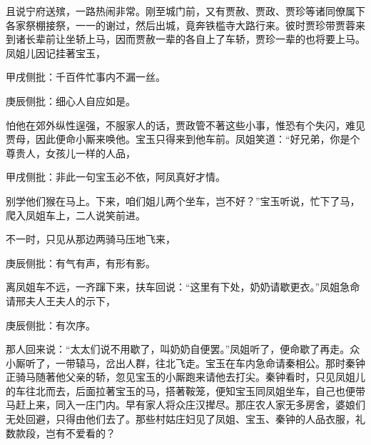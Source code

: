 \begin{parag}
    且说宁府送殡，一路热闹非常。刚至城门前，又有贾赦、贾政、贾珍等诸同僚属下各家祭棚接祭，一一的谢过，然后出城，竟奔铁槛寺大路行来。彼时贾珍带贾蓉来到诸长辈前让坐轿上马，因而贾赦一辈的各自上了车轿，贾珍一辈的也将要上马。凤姐儿因记挂著宝玉，\begin{note}甲戌侧批：千百件忙事内不漏一丝。\end{note}\begin{note}庚辰侧批：细心人自应如是。\end{note}怕他在郊外纵性逞强，不服家人的话，贾政管不著这些小事，惟恐有个失闪，难见贾母，因此便命小厮来唤他。宝玉只得来到他车前。凤姐笑道：“好兄弟，你是个尊贵人，女孩儿一样的人品，\begin{note}甲戌侧批：非此一句宝玉必不依，阿凤真好才情。\end{note}别学他们猴在马上。下来，咱们姐儿两个坐车，岂不好？”宝玉听说，忙下了马，爬入凤姐车上，二人说笑前进。
\end{parag}


\begin{parag}
    不一时，只见从那边两骑马压地飞来，\begin{note}庚辰侧批：有气有声，有形有影。\end{note}离凤姐车不远，一齐蹿下来，扶车回说：“这里有下处，奶奶请歇更衣。”凤姐急命请邢夫人王夫人的示下，\begin{note}庚辰侧批：有次序。\end{note}那人回来说：“太太们说不用歇了，叫奶奶自便罢。”凤姐听了，便命歇了再走。众小厮听了，一带辕马，岔出人群，往北飞走。宝玉在车内急命请秦相公。那时秦钟正骑马随著他父亲的轿，忽见宝玉的小厮跑来请他去打尖。秦钟看时，只见凤姐儿的车往北而去，后面拉著宝玉的马，搭著鞍笼，便知宝玉同凤姐坐车，自己也便带马赶上来，同入一庄门内。早有家人将众庄汉撵尽。那庄农人家无多房舍，婆娘们无处回避，只得由他们去了。那些村姑庄妇见了凤姐、宝玉、秦钟的人品衣服，礼数款段，岂有不爱看的？
\end{parag}


